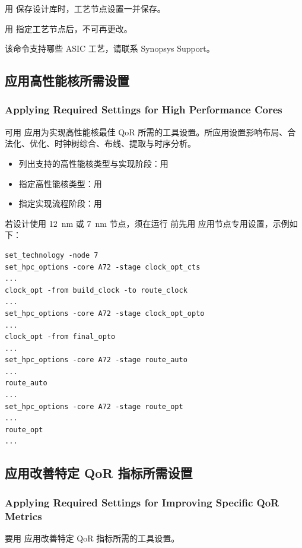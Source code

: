 用  保存设计库时，工艺节点设置一并保存。

\begin{noteBox}
用  指定工艺节点后，不可再更改。
\end{noteBox}

该命令支持哪些 ASIC 工艺，请联系 Synopsys Support。

\subsection{应用高性能核所需设置}
\subsubsection*{Applying Required Settings for High Performance Cores}

可用  应用为实现高性能核最佳 QoR 所需的工具设置。所应用设置影响布局、合法化、优化、时钟树综合、布线、提取与时序分析。

\begin{itemize}
  \item 列出支持的高性能核类型与实现阶段：用 
  \item 指定高性能核类型：用 
  \item 指定实现流程阶段：用 
\end{itemize}

若设计使用 12~nm 或 7~nm 节点，须在运行  前先用  应用节点专用设置，示例如下：
\begin{lstlisting}
set_technology -node 7
set_hpc_options -core A72 -stage clock_opt_cts
...
clock_opt -from build_clock -to route_clock
...
set_hpc_options -core A72 -stage clock_opt_opto
...
clock_opt -from final_opto
...
set_hpc_options -core A72 -stage route_auto
...
route_auto
...
set_hpc_options -core A72 -stage route_opt
...
route_opt
...
\end{lstlisting}

\subsection{应用改善特定 QoR 指标所需设置}
\subsubsection*{Applying Required Settings for Improving Specific QoR Metrics}

要用  应用改善特定 QoR 指标所需的工具设置。


